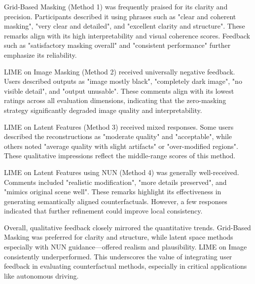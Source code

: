 Grid-Based Masking (Method 1) was frequently praised for its clarity and precision. Participants described it using phrases such as "clear and coherent masking", "very clear and detailed", and "excellent clarity and structure". These remarks align with its high interpretability and visual coherence scores. Feedback such as "satisfactory masking overall" and "consistent performance" further emphasize its reliability.

LIME on Image Masking (Method 2) received universally negative feedback. Users described outputs as "image mostly black", "completely dark image", "no visible detail", and "output unusable". These comments align with its lowest ratings across all evaluation dimensions, indicating that the zero-masking strategy significantly degraded image quality and interpretability.

LIME on Latent Features (Method 3) received mixed responses. Some users described the reconstructions as "moderate quality" and "acceptable", while others noted "average quality with slight artifacts" or "over-modified regions". These qualitative impressions reflect the middle-range scores of this method.

LIME on Latent Features using NUN (Method 4) was generally well-received. Comments included "realistic modification", "more details preserved", and "mimics original scene well". These remarks highlight its effectiveness in generating semantically aligned counterfactuals. However, a few responses indicated that further refinement could improve local consistency.

Overall, qualitative feedback closely mirrored the quantitative trends. Grid-Based Masking was preferred for clarity and structure, while latent space methods especially with NUN guidance—offered realism and plausibility. LIME on Image consistently underperformed. This underscores the value of integrating user feedback in evaluating counterfactual methods, especially in critical applications like autonomous driving.